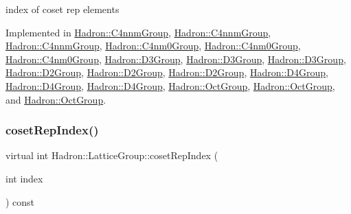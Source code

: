index of coset rep elements 

Implemented in \mbox{\hyperlink{structHadron_1_1C4nnmGroup_a413031d9855013b22c493696c69a2c4d}{Hadron\+::\+C4nnm\+Group}}, \mbox{\hyperlink{structHadron_1_1C4nnmGroup_a413031d9855013b22c493696c69a2c4d}{Hadron\+::\+C4nnm\+Group}}, \mbox{\hyperlink{structHadron_1_1C4nnmGroup_a413031d9855013b22c493696c69a2c4d}{Hadron\+::\+C4nnm\+Group}}, \mbox{\hyperlink{structHadron_1_1C4nm0Group_abac118ef8b96cecf62143c917e23736e}{Hadron\+::\+C4nm0\+Group}}, \mbox{\hyperlink{structHadron_1_1C4nm0Group_abac118ef8b96cecf62143c917e23736e}{Hadron\+::\+C4nm0\+Group}}, \mbox{\hyperlink{structHadron_1_1C4nm0Group_abac118ef8b96cecf62143c917e23736e}{Hadron\+::\+C4nm0\+Group}}, \mbox{\hyperlink{structHadron_1_1D3Group_a361cfe22330be972fe6d49bc2e1af871}{Hadron\+::\+D3\+Group}}, \mbox{\hyperlink{structHadron_1_1D3Group_a361cfe22330be972fe6d49bc2e1af871}{Hadron\+::\+D3\+Group}}, \mbox{\hyperlink{structHadron_1_1D3Group_a361cfe22330be972fe6d49bc2e1af871}{Hadron\+::\+D3\+Group}}, \mbox{\hyperlink{structHadron_1_1D2Group_a41bfcefe5a659b99db790f822123593f}{Hadron\+::\+D2\+Group}}, \mbox{\hyperlink{structHadron_1_1D2Group_a41bfcefe5a659b99db790f822123593f}{Hadron\+::\+D2\+Group}}, \mbox{\hyperlink{structHadron_1_1D2Group_a41bfcefe5a659b99db790f822123593f}{Hadron\+::\+D2\+Group}}, \mbox{\hyperlink{structHadron_1_1D4Group_ae7ebfa25f82987479c33f0d5d769ab2f}{Hadron\+::\+D4\+Group}}, \mbox{\hyperlink{structHadron_1_1D4Group_ae7ebfa25f82987479c33f0d5d769ab2f}{Hadron\+::\+D4\+Group}}, \mbox{\hyperlink{structHadron_1_1D4Group_ae7ebfa25f82987479c33f0d5d769ab2f}{Hadron\+::\+D4\+Group}}, \mbox{\hyperlink{structHadron_1_1OctGroup_aeaabc93ad3df1b585bc1009b0bf4f5ba}{Hadron\+::\+Oct\+Group}}, \mbox{\hyperlink{structHadron_1_1OctGroup_aeaabc93ad3df1b585bc1009b0bf4f5ba}{Hadron\+::\+Oct\+Group}}, and \mbox{\hyperlink{structHadron_1_1OctGroup_aeaabc93ad3df1b585bc1009b0bf4f5ba}{Hadron\+::\+Oct\+Group}}.

\mbox{\label{structHadron_1_1LatticeGroup_a7e3b9b5e2f596e6c40d64aa939a3ad6c}} 
\subsubsection{\texorpdfstring{cosetRepIndex()}{cosetRepIndex()}\hspace{0.1cm}{\footnotesize\ttfamily [2/3]}}
{\footnotesize\ttfamily virtual int Hadron\+::\+Lattice\+Group\+::coset\+Rep\+Index (\begin{DoxyParamCaption}\item[{int}]{index }\end{DoxyParamCaption}) const\hspace{0.3cm}{\ttfamily [pure virtual]}}

